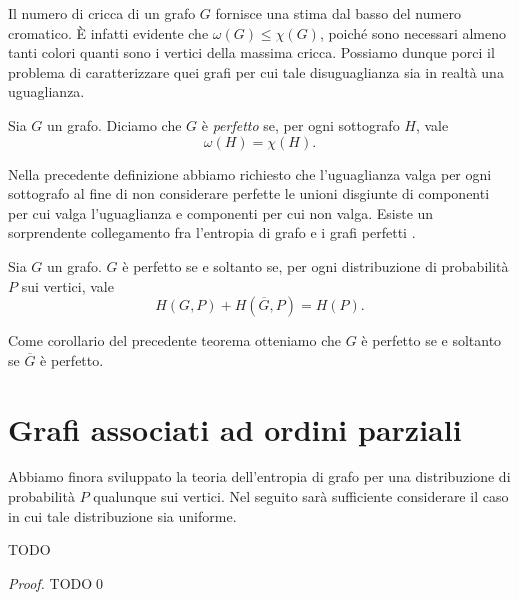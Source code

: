 Il numero di cricca di un grafo \(G\) fornisce una stima dal basso del numero cromatico. È infatti evidente che \(\omega(G)\le\chi(G)\), poiché sono necessari almeno tanti colori quanti sono i vertici della massima cricca. Possiamo dunque porci il problema di caratterizzare quei grafi per cui tale disuguaglianza sia in realtà una uguaglianza. 
\begin{definition}
	Sia \(G\) un grafo. Diciamo che \(G\) è \emph{perfetto} se, per ogni sottografo \(H\), vale
	\[\omega(H)=\chi(H).\]
\end{definition}
Nella precedente definizione abbiamo richiesto che l'uguaglianza valga per ogni sottografo al fine di non considerare perfette le unioni disgiunte di componenti per cui valga l'uguaglianza e componenti per cui non valga. Esiste un sorprendente collegamento fra l'entropia di grafo e i grafi perfetti \cite{Csiszar1990}. 
\begin{theorem}
	 Sia \(G\) un grafo. \(G\) è perfetto se e soltanto se, per ogni distribuzione di probabilità \(P\) sui vertici, vale
	\[H\left(G,P\right)+H\left(\overline{G},P\right)=H(P).\]
	\label{lovasztheorem}
\end{theorem}
Come corollario del precedente teorema otteniamo che \(G\) è perfetto se e soltanto se \(\overline{G}\) è perfetto.

\section{Grafi associati ad ordini parziali}

Abbiamo finora sviluppato la teoria dell'entropia di grafo per una distribuzione di probabilità \(P\) qualunque sui vertici. Nel seguito sarà sufficiente considerare il caso in cui tale distribuzione sia uniforme.

\begin{lemma}[Chvatál]
  TODO
\end{lemma}
\begin{proof}
  TODO\qed
\end{proof}

